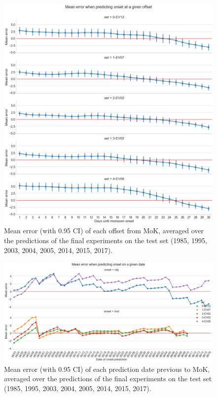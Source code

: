 \begin{figure}[h]
  \centering
  \includegraphics[width=0.9\linewidth]{./99_appendix/img/prediction_error_offset_split.png}
  \caption{Mean error (with 0.95 CI) of each offset from MoK, averaged over the predictions of the final experiments on the test set (1985, 1995, 2003, 2004, 2005, 2014, 2015, 2017).}
  \label{apx:prediction_error_offset_ci}
\end{figure}

\begin{figure}[h]
  \centering
  \includegraphics[width=\linewidth]{./99_appendix/img/prediction_error_dates.png}
  \caption{Mean error (with 0.95 CI) of each prediction date previous to MoK, averaged over the predictions of the final experiments on the test set (1985, 1995, 2003, 2004, 2005, 2014, 2015, 2017).}
  \label{apx:prediction_error_dates_ci}
\end{figure}

